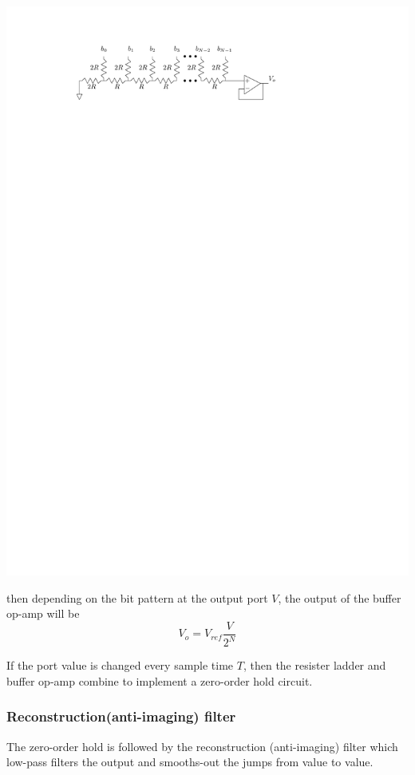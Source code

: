 \begin{center}
  \includegraphics[scale=1]{graphics/resistor-ladder.pdf}
\end{center}


then depending on the bit pattern at the output port $V$, the output of the buffer op-amp will be
\[
V_o = V_{ref}\frac{V}{2^N}
\]

If the port value is changed every sample time $T$, then the resister ladder and buffer op-amp combine to implement a zero-order hold circuit.

\subsubsection{Reconstruction(anti-imaging) filter}

The zero-order hold is followed by the reconstruction (anti-imaging) filter which low-pass filters the output and smooths-out the jumps from value to value.

